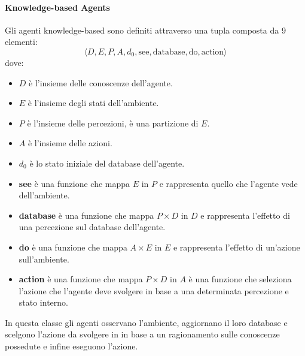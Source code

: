 \paragraph{Knowledge-based Agents}
Gli agenti knowledge-based sono definiti attraverso una tupla composta da 9 elementi:
\begin{equation*}
    \langle D, E, P, A, d_0, \text{see}, \text{database}, \text{do}, \text{action} \rangle
\end{equation*}
dove:
\begin{itemize}
    \item $D$ è l'insieme delle conoscenze dell'agente.
    \item $E$ è l'insieme degli stati dell'ambiente.
    \item $P$ è l'insieme delle percezioni, è una partizione di $E$.
    \item $A$ è l'insieme delle azioni.
    \item $d_0$ è lo stato iniziale del database dell'agente.
    \item \textbf{see} è una funzione che mappa $E$ in $P$ e rappresenta quello
          che l'agente vede dell'ambiente.
    \item \textbf{database} è una funzione che mappa $P \times D$ in $D$ e
          rappresenta l'effetto di una percezione sul database dell'agente.
    \item \textbf{do} è una funzione che mappa $A \times E$ in $E$ e rappresenta
          l'effetto di un'azione sull'ambiente.
    \item \textbf{action} è una funzione che mappa $P \times D$ in $A$ è una funzione
          che seleziona l'azione che l'agente deve svolgere in base a una determinata
          percezione e stato interno.
\end{itemize}
In questa classe gli agenti osservano l'ambiente, aggiornano il loro database
e scelgono l'azione da svolgere in in base a un ragionamento sulle conoscenze
possedute e infine eseguono l'azione.

